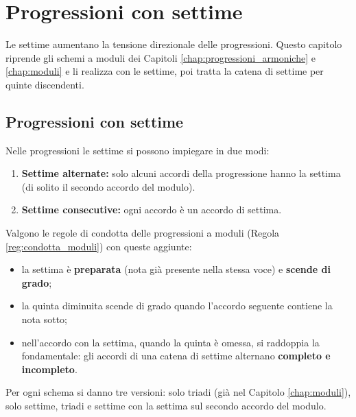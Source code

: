 \chapter{Progressioni con settime}
\label{chap:progressioni_settime}

Le settime aumentano la tensione direzionale delle progressioni. Questo capitolo riprende gli schemi a moduli dei Capitoli \ref{chap:progressioni_armoniche} e \ref{chap:moduli} e li realizza con le settime, poi tratta la catena di settime per quinte discendenti.

\section{Progressioni con settime}
\label{sec:progressioni_settime}

\begin{regola}
	\label{reg:progressioni_settime}
	Nelle progressioni le settime si possono impiegare in due modi:
	\begin{enumerate}
		\item \textbf{Settime alternate:} solo alcuni accordi della progressione hanno la settima (di solito il secondo accordo del modulo).
		\item \textbf{Settime consecutive:} ogni accordo è un accordo di settima.
	\end{enumerate}
	Valgono le regole di condotta delle progressioni a moduli (Regola \ref{reg:condotta_moduli}) con queste aggiunte:
	\begin{itemize}
		\item la settima è \textbf{preparata} (nota già presente nella stessa voce) e \textbf{scende di grado};
		\item la quinta diminuita scende di grado quando l'accordo seguente contiene la nota sotto;
		\item nell'accordo con la settima, quando la quinta è omessa, si raddoppia la fondamentale: gli accordi di una catena di settime alternano \textbf{completo e incompleto}.
	\end{itemize}
\end{regola}

Per ogni schema si danno tre versioni: solo triadi (già nel Capitolo \ref{chap:moduli}), solo settime, triadi e settime con la settima sul secondo accordo del modulo.

